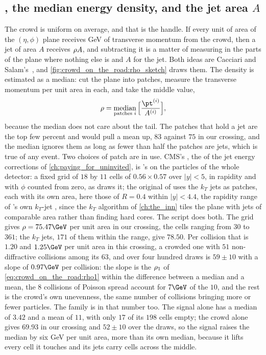 \subsection{\rhoPU, the median energy density, and the jet area $A$}
\label{sec:crowd_on_the_road:rho_the_median_energy_density_and_the_je}

The crowd is uniform on average, and that is the handle. If every unit of
area of the $(\eta,\phi)$ plane receives \rhoPU GeV of transverse momentum
from the crowd, then a jet of area $A$ receives $\rho A$, and
subtracting it is a matter of measuring \rhoPU in the parts of the plane
where nothing else is and $A$ for the jet. Both ideas are Cacciari and
Salam's~\cite{Cacciari:2007fd}, and \cref{fig:crowd_on_the_road:rho_sketch}
draws them. The density is estimated as a median: cut the plane into
patches, measure the transverse momentum per unit area in each, and take
the middle value,
\begin{equation}
  \rhoPU=\operatorname*{median}_{\text{patches }i}\Big[\frac{\pt^{(i)}}{A^{(i)}}\Big],
  \label{eq:crowd_on_the_road:rho}
\end{equation}
because the median does not care about the tail. The patches that hold a
jet are the top few percent and would pull a mean up, $83$ against $75$
in our crossing, and the median ignores them as long as fewer than half
the patches are jets, which is true of any event. Two choices of patch are
in use. CMS's , the \rhoPU of the jet energy
corrections of \cref{ch:paying_for_uninvited}, is \FASTJET's
 on the particles of the whole
detector: a fixed grid of $18$ by $11$ cells of $0.56\times0.57$ over
$|y|<5$, in rapidity and with $\phi$ counted from zero, as \FASTJET draws
it; the original of \cite{Cacciari:2007fd} uses the $k_T$ jets as
patches, each with its own area, here those of $R=0.4$ within $|y|<4.4$,
the rapidity range of \CMSSW's own $k_T$-jet \rhoPU, since the
$k_T$ algorithm of \cref{ch:the_inn} tiles the plane with jets of
comparable area rather than finding hard cores. The script does both. The
grid gives $\rhoPU=75.47\GeV$ per unit area in our crossing, the cells
ranging from $30$ to $361$; the $k_T$ jets, $171$ of them within the
range, give $78.50$. Per collision that is $1.20$ and $1.25\GeV$ per unit
area in this crossing, a crowded one with $51$ non-diffractive collisions
among its $63$, and over four hundred draws \rhoPU is $59\pm10$ with a
slope of $0.97\GeV$ per collision: the slope is the
$\rho_1$ of \cref{eq:crowd_on_the_road:rho1} within the difference
between a median and a mean, the $8$ collisions of Poisson spread
account for $7\GeV$ of the $10$, and the rest is the crowd's own
unevenness, the same number of collisions bringing more or fewer
particles. The family is in that number too. The signal alone has a
median of $3.42$ and a mean of $11$, with only $17$ of its $198$ cells
empty; the crowd alone gives $69.93$ in our crossing and $52\pm10$ over
the draws, so the signal raises the median by six GeV per unit area,
more than its own median, because it lifts every cell it touches and
its jets carry cells across the middle.

